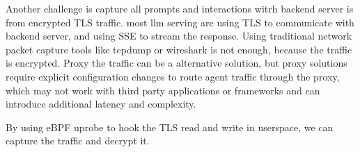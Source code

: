 \documentclass[sigplan,screen，review,9pt]{acmart}
\begin{document}
Another challenge is capture all prompts and interactions witrh backend server is from encrypted TLS traffic. most llm serving are using TLS to communicate with backend server, and using SSE to stream the response. Using traditional network packet capture tools like tcpdump or wireshark is not enough, because the traffic is encrypted. Proxy the traffic can be a alternative solution, but proxy solutions require explicit configuration changes to route agent traffic through the proxy, which may not work with third party applications or frameworks and can introduce additional latency and complexity.

By using eBPF uprobe to hook the TLS read and write in userspace, we can capture the traffic and decrypt it.
\end{document}
